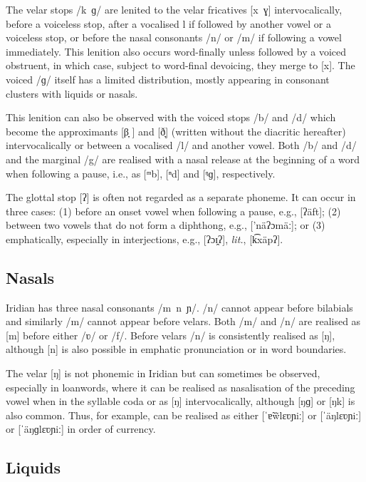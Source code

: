 The velar stops /k~ɡ/ are lenited to the velar fricatives [x~ɣ] intervocalically, before a voiceless stop, after a vocalised l if followed by another vowel or a voiceless stop, or before the nasal consonants /n/ or /m/ if following a vowel immediately. This lenition also occurs word-finally unless followed by a voiced obstruent, in which case, subject to word-final devoicing, they merge to [x]. The voiced /ɡ/ itself has a limited distribution, mostly appearing in consonant clusters with liquids or nasals.

This lenition can also be observed with the voiced stops /b/ and /d/ which become the approximants [β̞	] and [ð̞] (written without the diacritic hereafter) intervocalically or between a vocalised /l/ and another vowel. Both /b/ and /d/ and the marginal /g/ are realised with a nasal release at the beginning of a word when following a pause, i.e., as [ᵐb], [ⁿd] and [ᵑɡ], respectively.

The glottal stop [ʔ] is often not regarded as a separate phoneme.
It can occur in three cases: (1) before an onset vowel when following a pause, e.g.,  [ʔäft]; (2) between two vowels that do not form a diphthong, e.g.,  ['näʔɔmäː]; or (3) emphatically, especially in interjections, e.g.,  [ʔɔɪ̯ʔ],  \emph{lit.},  [k͡xäpʔ].


\subsection{Nasals}
Iridian has three nasal consonants /m~n~ɲ/. /n/ cannot appear before bilabials and similarly /m/ cannot appear before velars. Both /m/ and /n/ are realised as [m] before either /ʋ/ or /f/. Before velars /n/ is consistently realised as [ŋ], although [n] is also possible in emphatic pronunciation or in word boundaries.

The velar [ŋ] is not phonemic in Iridian but can sometimes be observed, especially in loanwords, where it can be realised as nasalisation of the preceding vowel when in the syllable coda or as [ŋ] intervocalically, although [ŋɡ] or [ŋk] is also common. Thus, for example,  can be realised as either [ˈɐ̃w̃lɛʋɲiː] or [ˈäŋlɛʋɲiː] or [ˈäŋɡlɛʋɲiː] in order of currency.


\subsection{Liquids}

